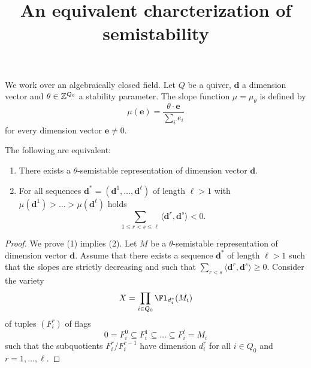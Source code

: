 \documentclass[a4paper]{article}
\title{An equivalent charcterization of semistability}
\author{}
\begin{document}
\maketitle

We work over an algebraically closed field. Let $Q$ be a quiver, $\mathbf{d}$ a dimension vector and $\theta \in \mathbb{Z}^{Q_0}$ a stability parameter. The slope function $\mu = \mu_\theta$ is defined by
\[
    \mu(\mathbf{e}) = \frac{\theta\cdot \mathbf{e}}{\sum_i e_i}    
\]
for every dimension vector $\mathbf{e} \neq 0$.

\begin{proposition}
    The following are equivalent:
    \begin{enumerate}
        \item There exists a $\theta$-semistable representation of dimension vector $\mathbf{d}$.
        \item For all sequences $\mathbf{d}^* = (\mathbf{d}^1,\ldots,\mathbf{d}^\ell)$ of length $\ell > 1$ with $\mu(\mathbf{d}^1) > \ldots > \mu(\mathbf{d}^\ell)$ holds
        \[
            \sum_{1 \leq r < s \leq \ell} \langle \mathbf{d}^r, \mathbf{d}^s \rangle < 0.    
        \]
    \end{enumerate}
\end{proposition}

\begin{proof}
    We prove (1) implies (2). Let $M$ be a $\theta$-semistable representation of dimension vector $\mathbf{d}$. Assume that there exists a sequence $\mathbf{d}^*$ of length $\ell > 1$ such that the slopes are strictly decreasing and such that $\sum_{r < s} \langle \mathbf{d}^r,\mathbf{d}^s \rangle \geq 0$. Consider the variety
    \[
        X = \prod_{i \in Q_0} \Fl_{d_i^*}(M_i)    
    \]
    of tuples $(F_i^r)$ of flags
    \[
        0 = F_i^0 \subseteq F_i^1 \subseteq \ldots \subseteq F_i^l = M_i     
    \]
    such that the subquotients $F_i^r/F_i^{r-1}$ have dimension $d_i^r$ for all $i \in Q_0$ and $r = 1,\ldots,\ell$.
\end{proof}

\end{document}
